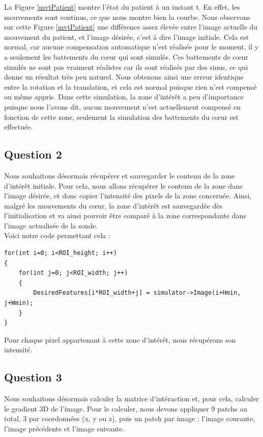 \documentclass[a4paper,11pt]{article}
\begin{document}
La Figure \ref{mvtPatient} montre l'\'etat du patient \`a un instant t. En effet, les mouvements sont continus, ce que nous montre bien la courbe. Nous observons sur cette Figure \ref{mvtPatient} une diff\'erence assez \'elev\'ee entre l'image actuelle du mouvement du patient, et l'image d\'esir\'ee, c'est \`a dire l'image initiale. Cela est normal, car aucune compensation automatique n'est r\'ealis\'ee pour le moment, il y a seulement les battements du c\oe ur qui sont simul\'es. Ces battements de c\oe ur simul\'es ne sont pas vraiment r\'ealistes car ils sont r\'ealis\'es par des sinus, ce qui donne un r\'esultat tr\`es peu naturel. Nous obtenons ainsi une erreur identique entre la rotation et la translation, et cela est normal puisque rien n'est compens\'e ou m\^eme appris.
Dans cette simulation, la zone d'int\'er\^et a peu d'importance puisque nous l'avons dit, aucun mouvement n'est actuellement compens\'e en fonction de cette zone, seulement la simulation des battements du c\oe ur est effectu\'ee.


\subsection{Question 2}
Nous souhaitons d\'esormais r\'ecup\'erer et sauvegarder le contenu de la zone d'int\'er\^et initiale. Pour cela, nous allons r\'ecup\'erer le contenu de la zone dans l'image d\'esir\'ee, et donc copier l'intensit\'e des pixels de la zone concern\'ee. Ainsi, malgr\'e les mouvements du c\oe ur, la zone d'int\'er\^et est sauvegard\'ee d\`es l'initialisation et va ainsi pouvoir \^etre compar\'e \`a la zone correspondante dans l'image actualis\'ee de la sonde.\\

Voici notre code permettant cela :
\begin{verbatim}
for(int i=0; i<ROI_height; i++) 
{
    for(int j=0; j<ROI_width; j++) 
    {
        DesiredFeatures[i*ROI_width+j] = simulator->Image(i+Hmin, j+Wmin);
    }
}
\end{verbatim}

Pour chaque pixel appartenant \`a cette zone d'int\'er\^et, nous r\'ecup\'erons son intensit\'e.

\subsection{Question 3}
Nous souhaitons d\'esormais calculer la matrice d'int\'eraction et, pour cela, calculer le gradient 3D de l'image. Pour le calculer, nous devons appliquer 9 patchs au total, 3 par coordonn\'ees (x, y ou z), puis un patch par image : l'image courante, l'image pr\'ec\'edente et l'image suivante. \\
\end{document}
